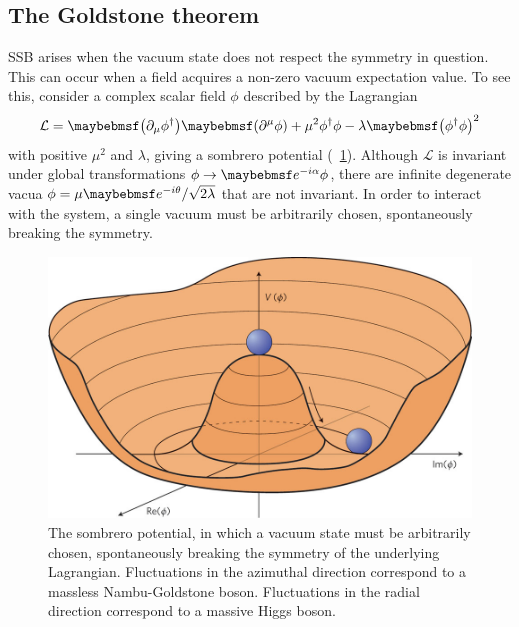 \subsection{The Goldstone theorem}
\label{sec:ewsb:goldstone}
\ac{SSB} arises when the vacuum state does not respect the symmetry in question. This can 
occur when a field acquires a non-zero vacuum expectation value. To see this, consider a 
complex scalar field $\phi$ described by the Lagrangian
\begin{equation}
	\mathcal{L} 
	= \parenths{\partial_{\mu}\phi^{\dagger}} \parenths{\partial^{\mu}\phi} 
	+ \mu^2 \phi^{\dagger}\phi - \lambda \parenths{\phi^{\dagger}\phi}^2
	\label{eq:lagr:goldstone}
\end{equation}
with positive $\mu^2$ and $\lambda$, giving a sombrero potential 
(\Figure~\ref{fig:sombrero}). 
Although $\mathcal{L}$ is invariant under global  transformations 
$\phi \rightarrow \eexp{-i\alpha} \phi$, there are infinite degenerate vacua
$\phi = \mu\eexp{-i\theta}/\sqrt{2\lambda}$ that are not invariant. In order to interact 
with the system, a single vacuum must be arbitrarily chosen, spontaneously breaking the 
 symmetry.

\begin{figure}[b]
	\includegraphics[width=\mediumfigwidth]{tex/motivation/sombrero}
	\caption{The sombrero potential, in which a vacuum state must be arbitrarily chosen, 
	spontaneously breaking the symmetry of the underlying Lagrangian.
	Fluctuations in the azimuthal direction correspond to a massless Nambu-Goldstone 
	boson. Fluctuations in the radial direction correspond to a massive Higgs boson.}
	\label{fig:sombrero}
\end{figure}

